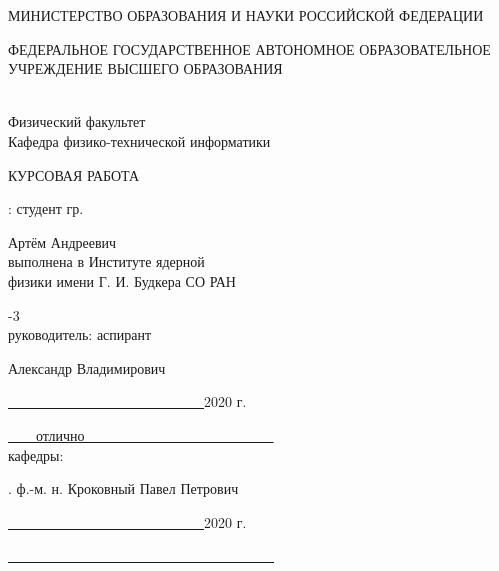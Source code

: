 \documentclass[14pt]{extarticle}
\begin{document}
	\setlength{\abovedisplayskip}{6pt}
	\setlength{\belowdisplayskip}{6pt}
	\setlength{\belowcaptionskip}{-15pt}
	\thispagestyle{fancy}
\begin{center}
    \small{МИНИСТЕРСТВО ОБРАЗОВАНИЯ И НАУКИ РОССИЙСКОЙ ФЕДЕРАЦИИ}
\end{center}
\begin{center}
    \small{ФЕДЕРАЛЬНОЕ ГОСУДАРСТВЕННОЕ АВТОНОМНОЕ ОБРАЗОВАТЕЛЬНОЕ\\УЧРЕЖДЕНИЕ ВЫСШЕГО ОБРАЗОВАНИЯ\\}\\
\end{center}
\begin{center}
    Физический факультет\\
    
    Кафедра физико-технической информатики
\end{center}
\smallskip
\begin{center}
    \small{КУРСОВАЯ РАБОТА}\\
    
    \normalsize{\textbf{}}
\end{center}
\bigskip
\setlength{\leftskip}{8 cm}
    : студент гр. 
    
     Артём Андреевич\\
    
     выполнена в Институте ядерной\\физики имени Г. И. Будкера СО РАН
    
    -3\\
    
     руководитель: аспирант
    
     Александр Владимирович
    
    \noindent\say{\underline{~~~~~~~~}}\underline{~~~~~~~~~~~~~~~~~~~~~~~~~~~~}2020 г.
    
    \underline{~~~~отлично~~~~~~~~~~~~~~~~~~~~~~~~~~~}\\
    
     кафедры:
    
    . ф.-м. н. Кроковный Павел Петрович
    
    \noindent\say{\underline{~~~~~~~~}}\underline{~~~~~~~~~~~~~~~~~~~~~~~~~~~~}2020 г.
    
    \underline{~~~~~~~~~~~~~~~~~~~~~~~~~~~~~~~~~~~~~~}
\end{document}
